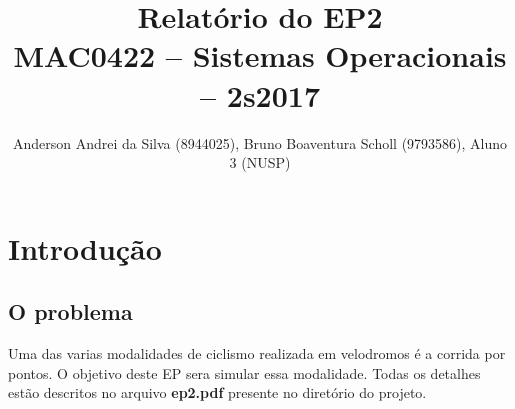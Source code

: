 \documentclass[12pt,a4paper]{article}
\title{Relatório do EP2\\MAC0422 -- Sistemas Operacionais -- 2s2017}
\author{Anderson Andrei da Silva (8944025), Bruno Boaventura Scholl (9793586), Aluno 3 (NUSP)}
\date{}
\begin{document}
\maketitle

\section{Introdução}

\subsection{O problema}

      Uma das varias modalidades de ciclismo realizada em velodromos é a corrida por pontos. O objetivo deste EP sera simular essa modalidade. Todas os detalhes estão descritos no arquivo \textbf{ep2.pdf} presente no diretório do projeto.

\end{document}
